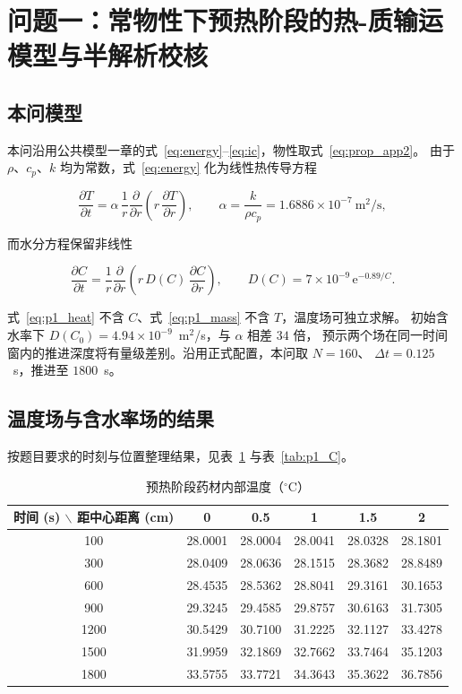 \section{问题一：常物性下预热阶段的热-质输运模型与半解析校核}

\subsection{本问模型}

本问沿用公共模型一章的式~\eqref{eq:energy}--\eqref{eq:ic}，物性取式~\eqref{eq:prop_app2}。
由于 $\rho$、$c_p$、$k$ 均为常数，式~\eqref{eq:energy} 化为线性热传导方程

\begin{equation}\label{eq:p1_heat}
\frac{\partial T}{\partial t}=\alpha\,\frac{1}{r}\frac{\partial}{\partial r}\!\left(r\,\frac{\partial T}{\partial r}\right),
\qquad \alpha=\frac{k}{\rho c_p}=1.6886\times10^{-7}~\mathrm{m^2/s},
\end{equation}

而水分方程保留非线性

\begin{equation}\label{eq:p1_mass}
\frac{\partial C}{\partial t}=\frac{1}{r}\frac{\partial}{\partial r}\!\left(r\,D(C)\,\frac{\partial C}{\partial r}\right),
\qquad D(C)=7\times10^{-9}\,\mathrm{e}^{-0.89/C}.
\end{equation}

式~\eqref{eq:p1_heat} 不含 $C$、式~\eqref{eq:p1_mass} 不含 $T$，温度场可独立求解。
初始含水率下 $D(C_0)=4.94\times10^{-9}$~m$^2$/s，与 $\alpha$ 相差 $34$ 倍，
预示两个场在同一时间窗内的推进深度将有量级差别。沿用正式配置，本问取 $N=160$、
$\Delta t=0.125$~s，推进至 $1800$~s。

\subsection{温度场与含水率场的结果}

按题目要求的时刻与位置整理结果，见表~\ref{tab:p1_T} 与表~\ref{tab:p1_C}。

\begin{table}[H]
\centering
\caption{预热阶段药材内部温度（$^\circ$C）}\label{tab:p1_T}
\begin{tabular}{cccccc}
\toprule
时间 (s) $\backslash$ 距中心距离 (cm) & 0 & 0.5 & 1 & 1.5 & 2 \\
\midrule
100  & 28.0001 & 28.0004 & 28.0041 & 28.0328 & 28.1801 \\
300  & 28.0409 & 28.0636 & 28.1515 & 28.3682 & 28.8489 \\
600  & 28.4535 & 28.5362 & 28.8041 & 29.3161 & 30.1653 \\
900  & 29.3245 & 29.4585 & 29.8757 & 30.6163 & 31.7305 \\
1200 & 30.5429 & 30.7100 & 31.2225 & 32.1127 & 33.4278 \\
1500 & 31.9959 & 32.1869 & 32.7662 & 33.7464 & 35.1203 \\
1800 & 33.5755 & 33.7721 & 34.3643 & 35.3622 & 36.7856 \\
\bottomrule
\end{tabular}
\end{table}

